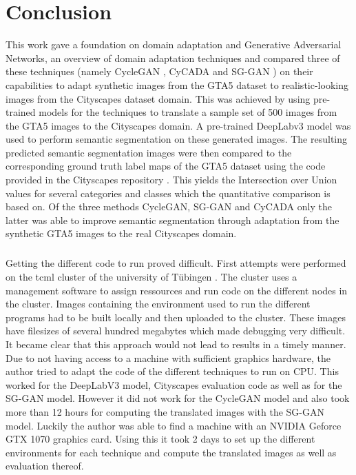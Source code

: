 \chapter{Conclusion}
\label{sec:conclusion}

This work gave a foundation on domain adaptation and Generative Adversarial Networks, an overview of domain adaptation techniques and compared three of these techniques (namely CycleGAN \cite{DBLP:journals/corr/ZhuPIE17}, CyCADA \cite{DBLP:journals/corr/abs-1711-03213} and SG-GAN \cite{DBLP:journals/corr/abs-1801-01726}) on their capabilities to adapt synthetic images from the GTA5 dataset \cite{Richter_2016_ECCV} to realistic-looking images from the Cityscapes dataset \cite{Cordts_2016_CVPR} domain. This was achieved by using pre-trained models for the techniques to translate a sample set of 500 images from the GTA5 images to the Cityscapes domain. A pre-trained DeepLabv3 \cite{DBLP:journals/corr/ChenPSA17} model was used to perform semantic segmentation on these generated images. The resulting predicted semantic segmentation images were then compared to the corresponding ground truth label maps of the GTA5 dataset using the code provided in the Cityscapes repository \cite{CSR}. This yields the Intersection over Union values for several categories and classes which the quantitative comparison is based on.
Of the three methods CycleGAN, SG-GAN and CyCADA only the latter was able to improve semantic segmentation through adaptation from the synthetic GTA5 images to the real Cityscapes domain.

\paragraph{}
Getting the different code to run proved difficult. First attempts were performed on the tcml cluster of the university of Tübingen \cite{tcml}. The cluster uses a management software to assign ressources and run code on the different nodes in the cluster. Images containing the environment used to run the different programs had to be built locally and then uploaded to the cluster. These images have filesizes of several hundred megabytes which made debugging very difficult. It became clear that this approach would not lead to results in a timely manner. Due to not having access to a machine with sufficient graphics hardware, the author tried to adapt the code of the different techniques to run on CPU. This worked for the DeepLabV3 model, Cityscapes evaluation code as well as for the SG-GAN model. However it did not work for the CycleGAN model and also took more than 12 hours for computing the translated images with the SG-GAN model. Luckily the author was able to find a machine with an NVIDIA Geforce GTX 1070 graphics card. Using this it took 2 days to set up the different environments for each technique and compute the translated images as well as evaluation thereof. 



